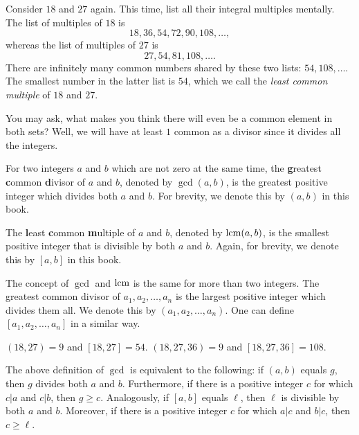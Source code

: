 \documentclass{subfile}
\begin{document}
	Consider $18$ and $27$ again. This time, list all their integral multiples mentally. The list of multiples of $18$ is $$18,36,54,72,90,108, \dots,$$ whereas the list of multiples of $27$ is $$27,54,81,108, \dots.$$ There are infinitely many common numbers shared by these two lists: $54, 108,\dots$. The smallest number in the latter list is $54$, which we call the {\it least common multiple} of $18$ and $27$.

	You may ask, what makes you think there will even be a common element in both sets? Well, we will have at least $1$ common as a divisor since it divides all the integers.
	\begin{definition}
		For two integers $a$ and $b$ which are not zero at the same time, the \textbf{g}reatest \textbf{c}ommon \textbf{d}ivisor of $a$ and $b$, denoted by $\gcd(a,b)$, is the greatest positive integer which divides both $a$ and $b$. For brevity, we denote this by $(a,b)$ in this book.

		The \textbf{l}east \textbf{c}ommon \textbf{m}ultiple of $a$ and $b$, denoted by $\operatorname{lcm}(a,b)$, is the smallest positive integer that is divisible by both $a$ and $b$. Again, for brevity, we denote this by $[a,b]$ in this book.
	\end{definition}

	The concept of $\gcd$ and $\operatorname{lcm}$ is the same for more than two integers. The greatest common divisor of $a_1,a_2,\dots,a_n$ is the largest positive integer which divides them all. We denote this by $(a_1,a_2,\dots,a_n)$. One can define $[a_1,a_2,\dots,a_n]$ in a similar way.

	\begin{example}
		$(18,27)=9$ and $[18,27]=54$. $(18,27,36)=9$ and $[18,27,36]=108$.
	\end{example}

	\begin{note}
		The above definition of $\gcd$ is equivalent to the following: if $(a, b)$ equals $g$, then $g$ divides both $a$ and $b$. Furthermore, if there is a positive integer $c$ for which $c|a$ and $c|b$, then $g \geq c$. Analogously, if $[a, b]$ equals $\ell$, then $\ell$ is divisible by both $a$ and $b$. Moreover, if there is a positive integer $c$ for which $a|c$ and $b|c$, then $c \geq \ell$.
	\end{note}
\end{document}
